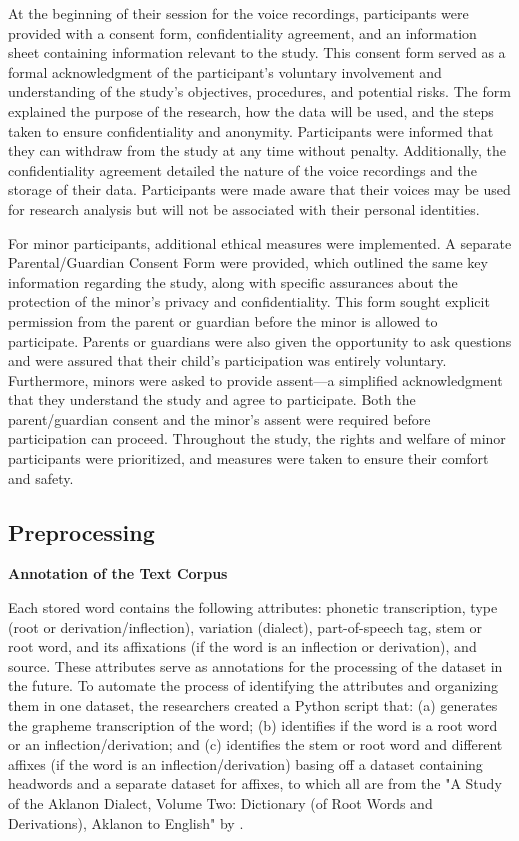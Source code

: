 At the beginning of their session for the voice recordings, participants were provided with a consent form, confidentiality agreement, and an information sheet containing information relevant to the study. This consent form served as a formal acknowledgment of the participant's voluntary involvement and understanding of the study's objectives, procedures, and potential risks. The form explained the purpose of the research, how the data will be used, and the steps taken to ensure confidentiality and anonymity. Participants were informed that they can withdraw from the study at any time without penalty. Additionally, the confidentiality agreement detailed the nature of the voice recordings and the storage of their data. Participants were made aware that their voices may be used for research analysis but will not be associated with their personal identities.

For minor participants, additional ethical measures were implemented. A separate Parental/Guardian Consent Form were provided, which outlined the same key information regarding the study, along with specific assurances about the protection of the minor’s privacy and confidentiality. This form sought explicit permission from the parent or guardian before the minor is allowed to participate. Parents or guardians were also given the opportunity to ask questions and were assured that their child’s participation was entirely voluntary. Furthermore, minors were asked to provide assent—a simplified acknowledgment that they understand the study and agree to participate. Both the parent/guardian consent and the minor's assent were required before participation can proceed. Throughout the study, the rights and welfare of minor participants were prioritized, and measures were taken to ensure their comfort and safety.

\subsection{Preprocessing}

\textbf{Annotation of the Text Corpus}

Each stored word contains the following attributes: phonetic transcription, type (root or derivation/inflection), variation (dialect), part-of-speech tag, stem or root word, and its affixations (if the word is an inflection or derivation), and source. These attributes serve as annotations for the processing of the dataset in the future. To automate the process of identifying the attributes and organizing them in one dataset, the researchers created a Python script that: (a) generates the grapheme transcription of the word; (b) identifies if the word is a root word or an inflection/derivation; and (c) identifies the stem or root word and different affixes (if the word is an inflection/derivation) basing off a dataset containing headwords and a separate dataset for affixes, to which all are from the "A Study of the Aklanon Dialect, Volume Two: Dictionary (of Root Words and Derivations), Aklanon to English" by .

